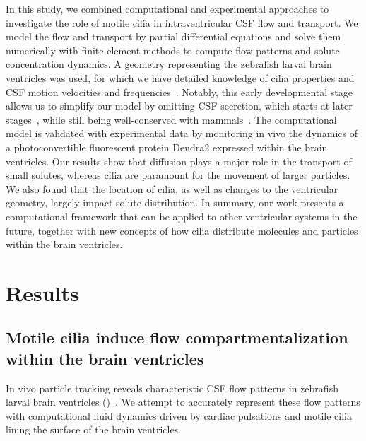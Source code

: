 \documentclass{WileyMSP-template}
\begin{document}
In this study, we combined computational and experimental approaches to investigate
the role of motile cilia in intraventricular CSF flow and transport.
We model the flow and transport by partial differential equations and solve
them numerically with finite element methods to compute flow patterns and
solute concentration dynamics. A geometry representing the zebrafish larval brain ventricles
was used, for which we have detailed knowledge of cilia properties and CSF motion velocities
and frequencies~\cite{Olstad2019CiliaryDevelopment}. 
Notably, this early developmental stage allows us to simplify our model
by omitting CSF secretion, which starts at later stages~\cite{Jeong2024TheZebrafish},
while still being well-conserved with mammals~\cite{DGama2025MotileBrain,
Olstad2019CiliaryDevelopment, Ringers2020Role, DGama2021Diversity, jurisch2020radial}. 
The computational model is validated with experimental data by monitoring in vivo
the dynamics of a photoconvertible fluorescent protein Dendra2
expressed within the brain ventricles.
Our results show that diffusion plays a major role in the transport of small solutes,
whereas cilia are paramount for the movement of larger particles.
We also found that the location of cilia, as well as changes to the ventricular geometry,
largely impact solute distribution.
In summary, our work presents a computational
framework that can be applied to other
ventricular systems in the future, together with new concepts
of how cilia distribute molecules and
particles within the brain ventricles. 

\section{Results}

\subsection{Motile cilia induce flow compartmentalization within the brain ventricles}


In vivo particle tracking reveals characteristic CSF flow patterns in
zebrafish larval brain ventricles
()~\cite{Olstad2019CiliaryDevelopment}.
We attempt to accurately represent these flow patterns with
computational fluid dynamics driven by cardiac pulsations and motile
cilia lining the surface of the brain ventricles.
\end{document}

